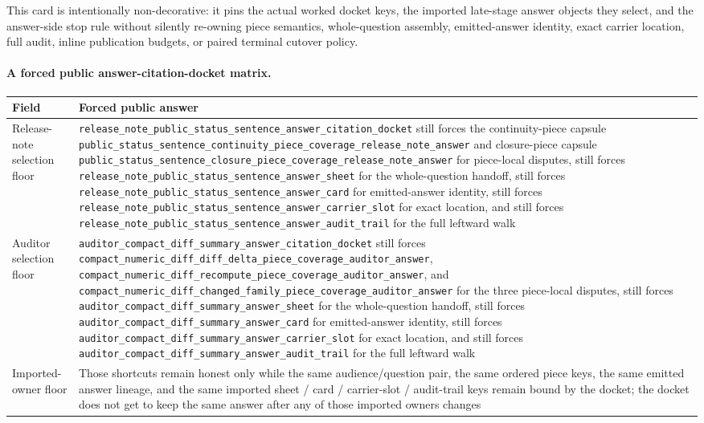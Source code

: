 \documentclass[11pt]{article}
\begin{document}
This card is intentionally non-decorative: it pins the actual worked docket keys, the imported late-stage answer objects they select, and the answer-side stop rule without silently re-owning piece semantics, whole-question assembly, emitted-answer identity, exact carrier location, full audit, inline publication budgets, or paired terminal cutover policy.\cite{series:workedexample}

\paragraph{A forced public answer-citation-docket matrix.}
\begin{table}[t]
\centering
\small
\begin{tabularx}{\linewidth}{@{}lX@{}}
\toprule
Field & Forced public answer \\
\midrule
Release-note selection floor & \nolinkurl{release_note_public_status_sentence_answer_citation_docket} still forces the continuity-piece capsule \nolinkurl{public_status_sentence_continuity_piece_coverage_release_note_answer} and closure-piece capsule \nolinkurl{public_status_sentence_closure_piece_coverage_release_note_answer} for piece-local disputes, still forces \nolinkurl{release_note_public_status_sentence_answer_sheet} for the whole-question handoff, still forces \nolinkurl{release_note_public_status_sentence_answer_card} for emitted-answer identity, still forces \nolinkurl{release_note_public_status_sentence_answer_carrier_slot} for exact location, and still forces \nolinkurl{release_note_public_status_sentence_answer_audit_trail} for the full leftward walk \\
Auditor selection floor & \nolinkurl{auditor_compact_diff_summary_answer_citation_docket} still forces \nolinkurl{compact_numeric_diff_diff_delta_piece_coverage_auditor_answer}, \nolinkurl{compact_numeric_diff_recompute_piece_coverage_auditor_answer}, and \nolinkurl{compact_numeric_diff_changed_family_piece_coverage_auditor_answer} for the three piece-local disputes, still forces \nolinkurl{auditor_compact_diff_summary_answer_sheet} for the whole-question handoff, still forces \nolinkurl{auditor_compact_diff_summary_answer_card} for emitted-answer identity, still forces \nolinkurl{auditor_compact_diff_summary_answer_carrier_slot} for exact location, and still forces \nolinkurl{auditor_compact_diff_summary_answer_audit_trail} for the full leftward walk \\
Imported-owner floor & Those shortcuts remain honest only while the same audience/question pair, the same ordered piece keys, the same emitted answer lineage, and the same imported sheet / card / carrier-slot / audit-trail keys remain bound by the docket; the docket does not get to keep the same answer after any of those imported owners changes \\

\end{tabularx}
\end{table}
\end{document}
